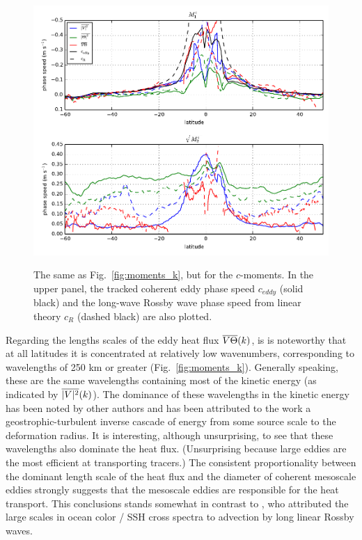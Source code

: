 \documentclass[10pt]{article}
\newcommand{\ol}{\ensuremath{\overline}}
\begin{document}
\begin{figure}[t]
  \noindent\includegraphics{../figures/moments_c.pdf}\\
  \caption{The same as Fig.~\ref{fig:moments_k}, but for the $c$-moments. In the upper panel, the tracked coherent eddy phase speed $c_{eddy}$ (solid black) and the long-wave Rossby wave phase speed from linear theory $c_R$ (dashed black) are also plotted. }
  \label{fig:moments_c}
\end{figure}

Regarding the lengths scales of the eddy heat flux $\ol{V\Theta}(k)$, is is noteworthy that at all latitudes it is concentrated at relatively low wavenumbers, corresponding to wavelengths of 250 km or greater (Fig.~\ref{fig:moments_k}). Generally speaking, these are the same wavelengths containing most of the kinetic energy (as indicated by $\ol{|V|^2}(k)$). The dominance of these wavelengths in the kinetic energy has been noted by other authors \citep[e.g.][]{Stammer1998,Wunsch2010,WorthamWunsch2014} and has been attributed to the work a geostrophic-turbulent inverse cascade of energy from some source scale to the deformation radius. It is interesting, although unsurprising, to see that these wavelengths also dominate the heat flux. (Unsurprising because large eddies are the most efficient at transporting tracers.) The consistent proportionality between the dominant length scale of the heat flux and the diameter of coherent mesoscale eddies strongly suggests that the mesoscale eddies are responsible for the heat transport. This conclusions stands somewhat in contrast to \citet{KillworthEtAl2004}, who attributed the large scales in ocean color / SSH cross spectra to advection by long linear Rossby waves.
\end{document}
